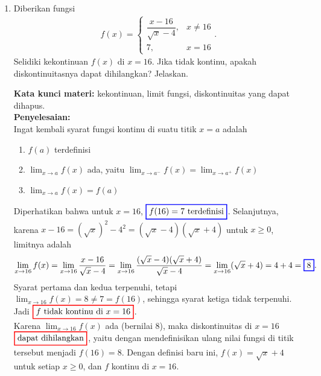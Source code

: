 \documentclass[10pt,openany,a4paper]{article}
\theoremstyle{definition}
\theoremstyle{definition}
\theoremstyle{plain}
\newenvironment{jawab}[2][tes]{%
\par\noindent\textbf{Kata kunci materi:} #1.\\
\textbf{Penyelesaian:} #2%
}{}
\begin{document}
\begin{enumerate}
    \item Diberikan fungsi
    \begin{align*}
        f(x)=\begin{cases}
            \dfrac{x-16}{\sqrt{x}-4}, & x\neq 16\\
            7, & x=16
        \end{cases}.
    \end{align*}
    Selidiki kekontinuan $f(x)$ di $x=16$. Jika tidak kontinu, apakah diskontinuitasnya dapat dihilangkan? Jelaskan.
    \begin{jawab}[kekontinuan, limit fungsi, diskontinuitas yang dapat dihapus]{~\\
        Ingat kembali syarat fungsi kontinu di suatu titik \(x = a\) adalah
        \begin{enumerate}
            \item \(f(a)\) terdefinisi
            \item \(\displaystyle \lim_{x \to a} f(x)\) ada, yaitu $\displaystyle \lim_{x \to a^-} f(x) = \lim_{x \to a^+} f(x)$
            \item \(\displaystyle\lim_{x \to a} f(x) = f(a)\)
        \end{enumerate}
        Diperhatikan bahwa untuk $x=16$, $\colorlet{oldcolor}{.}
        \color{blue}
        \setlength{\fboxrule}{1pt} \boxed{\color{oldcolor}f(16) = 7~\text{terdefinisi}}\color{oldcolor}$. Selanjutnya, karena $x-16=(\sqrt{x})^2-4^2=(\sqrt{x}-4)(\sqrt{x}+4)$ untuk $x\geq 0$, limitnya adalah
        \begin{align*}
            \lim_{x\to 16} f(x) = \lim_{x\to 16} \frac{x-16}{\sqrt{x}-4} = \lim_{x\to 16} \frac{(\sqrt{x}-4)(\sqrt{x}+4)}{\sqrt{x}-4} = \lim_{x\to 16} (\sqrt{x}+4) = 4+4 = \colorlet{oldcolor}{.}
        \color{blue}
        \setlength{\fboxrule}{1pt} \boxed{\color{oldcolor}8}\color{oldcolor}.
        \end{align*}
        Syarat pertama dan kedua terpenuhi, tetapi $\displaystyle\lim_{x\to 16}f(x)=8\neq 7=f(16)$, sehingga syarat ketiga tidak terpenuhi. Jadi $\colorlet{oldcolor}{.}
        \color{red}
        \setlength{\fboxrule}{1pt} \boxed{\color{oldcolor}f \text{ tidak kontinu di } x=16}\color{oldcolor}$.\\
        Karena $\displaystyle\lim_{x\to 16}f(x)$ ada (bernilai $8$), maka diskontinuitas di $x=16$ $\colorlet{oldcolor}{.}
        \color{red}
        \setlength{\fboxrule}{1pt} \boxed{\color{oldcolor}\text{dapat dihilangkan}}\color{oldcolor}$, yaitu dengan mendefinisikan ulang nilai fungsi di titik tersebut menjadi $f(16)=8$. Dengan definisi baru ini, $f(x)=\sqrt{x}+4$ untuk setiap $x\geq 0$, dan $f$ kontinu di $x=16$.
    }
    \end{jawab}


\end{enumerate}
\end{document}
